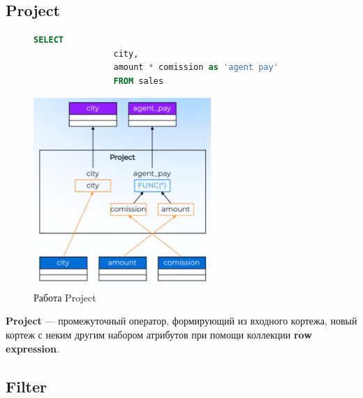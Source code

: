 \documentclass[11pt]{article}
\begin{document}
    \newpage

    \subsection{Project}

    \begin{figure}[h!]
        \begin{minipage}{0.4\textwidth}
            \begin{lstlisting}[language=SQL, caption={SQL приводящий в Project}]
                SELECT
                city,
                amount * comission as 'agent pay'
                FROM sales
            \end{lstlisting}
        \end{minipage}
        \begin{minipage}{0.6\textwidth}
            \centering
            \includegraphics[width=0.6\textwidth]{Pictures/Operators/Project}
            \caption{Работа Project}
        \end{minipage}
    \end{figure}

    \textbf{Project} --- промежуточный оператор, формирующий из входного кортежа, новый кортеж с неким другим набором атрибутов при помощи коллекции \textbf{row expression}.

    \newpage

    \subsection{Filter}
\end{document}

